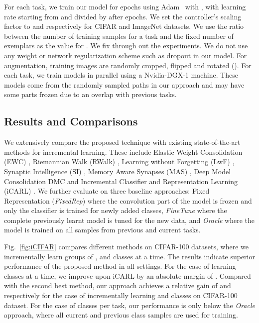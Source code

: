 For each task, we train our model for  epochs using Adam~\cite{kingma2014adam} with , with learning rate starting from  and divided by  after  epochs. We set the  controller's scaling factor to  and  respectively for CIFAR and ImageNet datasets. We use the ratio between the number of training samples for a task and the fixed number of exemplars as the value for . We fix  through out the experiments. We do not use any weight or network regularization scheme such as dropout in our model. For augmentation, training images are randomly cropped, flipped and rotated (). For each task, we train  models in parallel using a Nvidia-DGX-1 machine. These models come from the randomly sampled paths in our approach and may have some parts frozen due to an overlap with previous tasks. 


\subsection{Results and Comparisons}

We extensively compare the proposed technique with existing state-of-the-art methods for incremental learning. These include Elastic Weight Consolidation (EWC) \cite{kirkpatrick2017overcoming}, Riemannian Walk (RWalk) \cite{chaudhry2018riemannian}, Learning without Forgetting (LwF) \cite{li2018learning}, Synaptic Intelligence (SI) \cite{zenke2017continual}, Memory Aware Synapses (MAS) \cite{aljundi2018memory}, Deep Model Consolidation DMC \cite{zhang2019class} and Incremental Classifier and Representation Learning (iCARL) \cite{rebuffi2017icarl}. We further evaluate on three baseline approaches: Fixed Representation (\textit{FixedRep}) where the convolution part of the model is frozen and only the classifier is trained for newly added classes, \textit{FineTune} where the complete previously learnt model is tuned for the new data, and \textit{Oracle} where the model is trained on all samples  from previous and current tasks. 

Fig.~\ref{fig:iCIFAR} compares different methods on CIFAR-100 datasets, where we incrementally learn groups of ,  and  classes at a time. The results indicate superior performance of the proposed method in all settings. For the case of learning  classes at a time, we improve upon iCARL \cite{rebuffi2017icarl} by an absolute margin of . Compared with the second best method, our approach achieves a relative gain of  and  respectively for the case of incrementally learning  and  classes on CIFAR-100 dataset. For the case of  classes per task, our performance is  only  below the \textit{Oracle} approach, where all current and previous class samples are used for training. 

